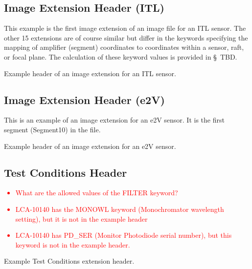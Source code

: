 \documentclass{article}[12pt]
\newcommand{\red}{\textcolor{red}}
\begin{document}
\subsection{Image Extension Header (ITL)}
This example is the first image extension of an image file for an ITL sensor.  The other 15 extensions are of course similar but differ in the keywords specifying the mapping of amplifier (segment) coordinates to coordinates within a sensor, raft, or focal plane.  The calculation of these keyword values is provided in \S~TBD.

\begin{table}
\begin{alltt}

\end{alltt}
\caption{Example header of an image extension for an ITL sensor. \label{tab:image_ITL}}
\end{table}

\subsection{Image Extension Header (e2V)}

This is an example of an image extension for an e2V sensor.  It is the first segment (Segment10) in the file.

\begin{table}
\begin{alltt}

\end{alltt}
\caption{Example header of an image extension for an e2V sensor.\label{tab:image_e2V}}
\end{table}

\subsection{Test Conditions Header}

\red{
\begin{itemize}
\item{What are the allowed values of the FILTER keyword?}
\item{LCA-10140 has the MONOWL keyword (Monochromator wavelength setting), but it is not in the example header}
\item{LCA-10140 has PD\_SER (Monitor Photodiode serial number), but this keyword is not in the example header.}
\end{itemize}
}

\begin{table}
\begin{alltt}

\end{alltt}
\caption{Example Test Conditions extension header.\label{table:test_cond}}
\end{table}
\end{document}
